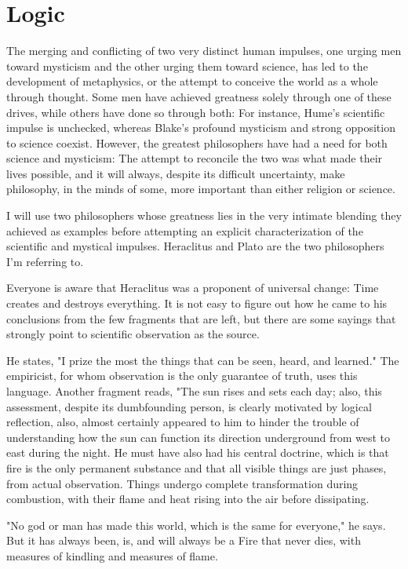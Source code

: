 \documentclass[a4paper,12pt]{book}[2004/02/16]
\theoremstyle{ilemma}
\theoremstyle{itheorem}
\theoremstyle{iother}
\theoremstyle{icorollary}
\theoremstyle{numcorollary}
\theoremstyle{idefinition}
\begin{document}
\chapter{Logic}
The merging and conflicting of two very distinct human impulses, one urging men toward mysticism and the other urging them toward science, has led to the development of metaphysics, or the attempt to conceive the world as a whole through thought. Some men have achieved greatness solely through one of these drives, while others have done so through both: For instance, Hume's scientific impulse is unchecked, whereas Blake's profound mysticism and strong opposition to science coexist. However, the greatest philosophers have had a need for both science and mysticism:
The attempt to reconcile the two was what made their lives possible, and it will always, despite its difficult uncertainty, make philosophy, in the minds of some, more important than either religion or science.

I will use two philosophers whose greatness lies in the very intimate blending they achieved as examples before attempting an explicit characterization of the scientific and mystical impulses. Heraclitus and Plato are the two philosophers I'm referring to.

Everyone is aware that Heraclitus was a proponent of universal change: Time creates and destroys everything. It is not easy to figure out how he came to his conclusions from the few fragments that are left, but there are some sayings that strongly point to scientific observation as the source.

He states, "I prize the most the things that can be seen, heard, and learned." The empiricist, for whom observation is the only guarantee of truth, uses this language. Another fragment reads, "The sun rises and sets each day; also, this assessment, despite its
dumbfounding person, is clearly motivated by logical reflection,
also, almost certainly appeared to him to hinder the trouble of understanding
how the sun can function its direction underground from west to east during the
night. He must have also had his central doctrine, which is that fire is the only permanent substance and that all visible things are just phases, from actual observation. Things undergo complete transformation during combustion, with their flame and heat rising into the air before dissipating.

"No god or man has made this world, which is the same for everyone," he says. But it has always been, is, and will always be a Fire that never dies, with measures of kindling and measures of flame.
\end{document}
